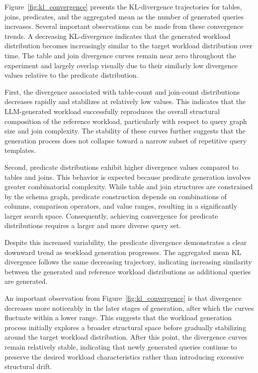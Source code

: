 Figure~\ref{fig:kl_convergence} presents the KL-divergence trajectories for tables, joins, predicates, and the aggregated mean as the number of generated queries increases. Several important observations can be made from these convergence trends. A decreasing KL-divergence indicates that the generated workload distribution becomes increasingly similar to the target workload distribution over time. The table and join divergence curves remain near zero throughout the experiment and largely overlap visually due to their similarly low divergence values relative to the predicate distribution.

First, the divergence associated with table-count and join-count distributions decreases rapidly and stabilizes at relatively low values. This indicates that the LLM-generated workload successfully reproduces the overall structural composition of the reference workload, particularly with respect to query graph size and join complexity. The stability of these curves further suggests that the generation process does not collapse toward a narrow subset of repetitive query templates.

Second, predicate distributions exhibit higher divergence values compared to tables and joins. This behavior is expected because predicate generation involves greater combinatorial complexity. While table and join structures are constrained by the schema graph, predicate construction depends on combinations of columns, comparison operators, and value ranges, resulting in a significantly larger search space. Consequently, achieving convergence for predicate distributions requires a larger and more diverse query set.

Despite this increased variability, the predicate divergence demonstrates a clear downward trend as workload generation progresses. The aggregated mean KL divergence follows the same decreasing trajectory, indicating increasing similarity between the generated and reference workload distributions as additional queries are generated.

An important observation from Figure~\ref{fig:kl_convergence} is that divergence decreases more noticeably in the later stages of generation, after which the curves fluctuate within a lower range. This suggests that the workload generation process initially explores a broader structural space before gradually stabilizing around the target workload distribution. After this point, the divergence curves remain relatively stable, indicating that newly generated queries continue to preserve the desired workload characteristics rather than introducing excessive structural drift.

